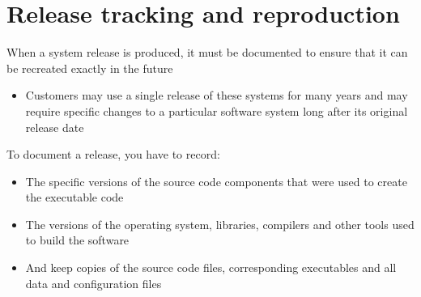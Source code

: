 \documentclass{article}[18pt]
\begin{document}
\section{Release tracking and reproduction}
When a system release is produced, it must be documented to ensure that it can be recreated exactly in the future
\begin{itemize}
	\item Customers may use a single release of these systems for many years and may require specific changes to a particular software system long after its original release date
\end{itemize}
To document a release, you have to record:
\begin{itemize}
	\item The specific versions of the source code components that were used to create the executable code
	\item The versions of the operating system, libraries, compilers and other tools used to build the software
	\item And keep copies of the source code files, corresponding executables and all data and configuration files
\end{itemize}
\end{document}
